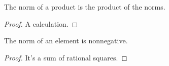 \begin{lemma}
    \label{Hurwitz.norm_mul}
    \leanok
    The norm of a product is the product of the norms.
\end{lemma}
\begin{proof}
    \leanok
    A calculation.
\end{proof}

\begin{lemma}
    \label{Hurwitz.norm_nonneg}
    \leanok
    The norm of an element is nonnegative.
\end{lemma}
\begin{proof} \leanok
    It's a sum of rational squares.
\end{proof}

